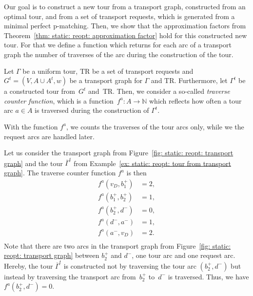 \documentclass[english]{llncs}
\numberwithin{sublemma}{lemma}
\newcommand{\NN}{\ensuremath{\mathbb{N}}}
\newcommand{\tourd}{\ensuremath{\Gamma}}
\newcommand{\TR}{\mathrm{TR}}
\begin{document}
Our goal is to construct a new tour from a transport graph, constructed from an optimal tour, and from a set of transport requests, which is generated from a minimal perfect p-matching.
Then, we show that the approximation factors from Theorem~\ref{thm: static: reopt: approximation factor} hold for this constructed new tour.
For that we define a function which returns for each arc of a transport graph the number of traverses of the arc during the construction of the tour.


Let $\tourd$ be a uniform tour, $\TR$ be a set of transport requests and $G^t = (V, A \cup A^t, w)$ be a transport graph for $\tourd$ and $\TR$.
Furthermore, let $\tourd^t$ be a constructed tour from~$G^t$ and~$\TR$.
Then, we consider a so-called \emph{traverse counter function}, which is a function~$f^a : A \to \NN$ which reflects how often a tour arc $a \in A$ is traversed during the construction of $\tourd^t$.

With the function $f^a$, we counts the traverses of the tour arcs only, while we the request arcs are handled later.


\begin{example}
\label{ex: static: reopt: traverse counter function}
Let us consider the transport graph from Figure~\ref{fig: static: reopt: transport graph} 
and the tour $\overline{\tourd}^t$ from Example~\ref{ex: static: reopt: tour from transport graph}.
The traverse counter function $f^a$ is then
\begin{align*}
 f^a(v_D, b^+_1)   & = 2, \\
 f^a(b^+_1, b^+_2) & = 1, \\
 f^a(b^+_2, d^-)   & = 0, \\
 f^a(d^-, a^-)     & = 1, \\
 f^a(a^-, v_D)     & = 2. \\
\end{align*}
Note that there are two arcs in the transport graph from Figure~\ref{fig: static: reopt: transport graph} between $b_2^+$ and $d^-$, one tour arc and one request arc.
Hereby, the tour $\overline{\tourd}^t$ is constructed not by traversing the tour arc $(b^+_2, d^-)$
but instead by traversing the transport arc from~$b^+_2$ to~$d^-$ is traversed.
Thus, we have $f^a(b^+_2, d^-) = 0$.
\end{example}
\end{document}

